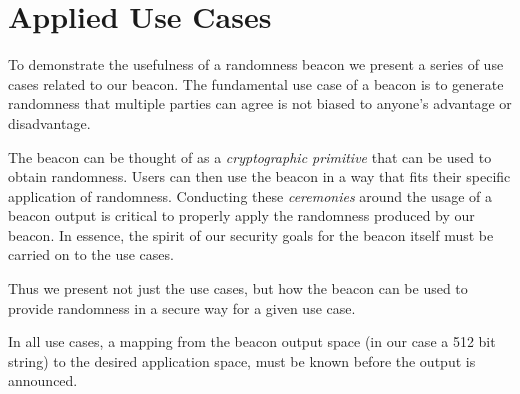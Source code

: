 \section{Applied Use Cases}
To demonstrate the usefulness of a randomness beacon we present a series of use cases related to our beacon.
The fundamental use case of a beacon is to generate randomness that multiple parties can agree is not biased to anyone's advantage or disadvantage.

The beacon can be thought of as a \emph{cryptographic primitive} that can be used to obtain randomness. Users can then use the beacon in a way that fits their specific application of randomness. Conducting these \emph{ceremonies} around the usage of a beacon output is critical to properly apply the randomness produced by our beacon. In essence, the spirit of our security goals for the beacon itself must be carried on to the use cases.

Thus we present not just the use cases, but how the beacon can be used to provide randomness in a secure way for a given use case.

In all use cases, a mapping from the beacon output space (in our case a 512 bit string) to the desired application space, must be known before the output is announced.